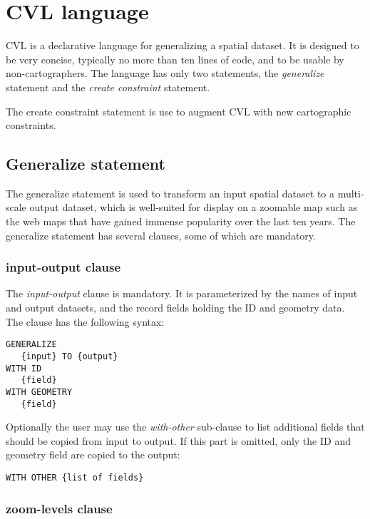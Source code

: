 \section{CVL language}
\label{sec:cvl-language}
CVL is a declarative language for generalizing a spatial dataset. It is designed to be very concise, typically no more than ten lines of code, and to be usable by non-cartographers. The language has only two statements, the \emph{generalize} statement and the \emph{create constraint} statement. 



The create constraint statement is use to augment CVL with new cartographic constraints.

\subsection{Generalize statement}
The generalize statement is used to transform an input spatial dataset to a multi-scale output dataset, which is well-suited for display on a zoomable map such as the web maps that have gained immense popularity over the last ten years. The generalize statement has several clauses, some of which are mandatory. 

\subsubsection{input-output clause}

The \emph{input-output} clause is mandatory. It is parameterized by the names of input and output datasets, and the record fields holding the ID and geometry data. The clause has the following syntax:

\begin{lstlisting}
GENERALIZE 
   {input} TO {output}
WITH ID
   {field}
WITH GEOMETRY 
   {field}
\end{lstlisting}

Optionally the user may use the \emph{with-other} sub-clause to list additional fields that should be copied from input to output. If this part is omitted, only the ID and geometry field are copied to the output:

\begin{lstlisting}
WITH OTHER {list of fields}
\end{lstlisting}

\subsubsection{zoom-levels clause}


